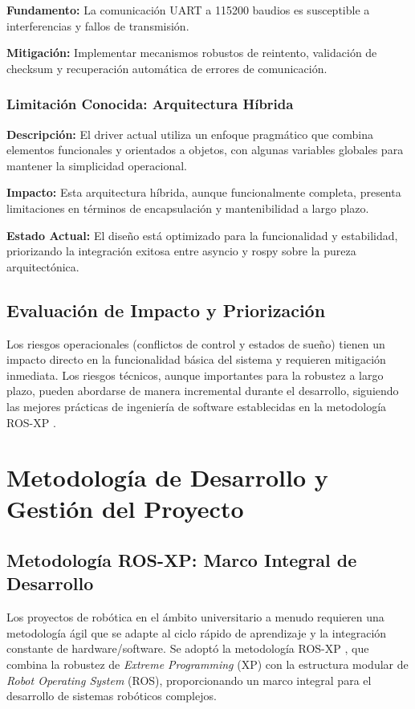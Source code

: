 \documentclass[11pt]{article}
\numberwithin{figure}{section}
\numberwithin{table}{section}
\begin{document}
\textbf{Fundamento:} La comunicación UART a 115200 baudios es susceptible a interferencias y fallos de transmisión.

\textbf{Mitigación:} Implementar mecanismos robustos de reintento, validación de checksum y recuperación automática de errores de comunicación.


\subsubsection{Limitación Conocida: Arquitectura Híbrida}

\textbf{Descripción:} El driver actual utiliza un enfoque pragmático que combina elementos funcionales y orientados a objetos, con algunas variables globales para mantener la simplicidad operacional.

\textbf{Impacto:} Esta arquitectura híbrida, aunque funcionalmente completa, presenta limitaciones en términos de encapsulación y mantenibilidad a largo plazo.

\textbf{Estado Actual:} El diseño está optimizado para la funcionalidad y estabilidad, priorizando la integración exitosa entre asyncio y rospy sobre la pureza arquitectónica.


\subsection{Evaluación de Impacto y Priorización}

Los riesgos operacionales (conflictos de control y estados de sueño) tienen un impacto directo en la funcionalidad básica del sistema y requieren mitigación inmediata. Los riesgos técnicos, aunque importantes para la robustez a largo plazo, pueden abordarse de manera incremental durante el desarrollo, siguiendo las mejores prácticas de ingeniería de software establecidas en la metodología ROS-XP \cite{RamirezBedoya2019ROSXP}.


\newpage


\section{Metodología de Desarrollo y Gestión del Proyecto}


\subsection{Metodología ROS-XP: Marco Integral de Desarrollo}
\label{sec:metodologia_ros_xp}

Los proyectos de robótica en el ámbito universitario a menudo requieren una metodología ágil que se adapte al ciclo rápido de aprendizaje y la integración constante de hardware/software. Se adoptó la metodología ROS-XP \cite{RamirezBedoya2019ROSXP}, que combina la robustez de \textit{Extreme Programming} (XP) con la estructura modular de \textit{Robot Operating System} (ROS), proporcionando un marco integral para el desarrollo de sistemas robóticos complejos.
\end{document}
